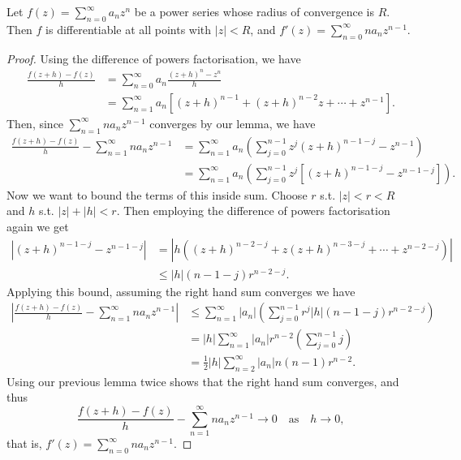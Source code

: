 \begin{theorem}
	Let $f(z) = \sum_{n = 0}^{\infty} a_n z^n$ be a power series whose radius of convergence is $R$. Then $f$ is differentiable at all points with $|z| < R$, and
	$
	f'(z) = \sum_{n = 0}^{\infty} n a_n z^{n - 1}.
	$
\end{theorem}
\begin{proof}
	Using the difference of powers factorisation, we have
	\begin{align*}
		\frac{f(z+h)-f(z)}{h}&=\sum_{n=0}^{\infty} a_{n} \frac{(z+h)^{n}-z^{n}}{h}\\&=\sum_{n=1}^{\infty} a_{n}\left[(z+h)^{n-1}+(z+h)^{n-2} z+\cdots+z^{n-1}\right].
	\end{align*}
	Then, since $\sum_{n = 1}^\infty n a_n z^{n - 1}$ converges by our lemma, we have
	\begin{align*}
		\frac{f(z+h)-f(z)}{h}-\sum_{n=1}^{\infty} n a_{n} z^{n-1} &= \sum_{n = 1}^{\infty} a_n \left(\sum_{j=0}^{n-1} z^{j}(z+h)^{n-1-j}-z^{n-1}\right) \\
		&= \sum_{n = 1}^{\infty} a_n \left(\sum_{j=0}^{n-1} z^{j}\left[(z+h)^{n-1-j}-z^{n-1 - j}\right]\right).
	\end{align*}
	Now we want to bound the terms of this inside sum. Choose $r$ s.t. $|z| < r < R$ and $h$ s.t. $|z| + |h| < r$. Then 
	employing the difference of powers factorisation again we get
	\begin{align*}
		|(z+h)^{n-1-j}-z^{n-1 - j}| &= |h((z + h)^{n - 2 - j} + z(z + h)^{n - 3 - j} + \cdots + z^{n - 2 - j})| \\
		&\leq |h|(n- 1 - j)r^{n - 2 - j}.
	\end{align*}
Applying this bound, assuming the right hand sum converges we have
\begin{align*}
	\left|\frac{f(z+h)-f(z)}{h}-\sum_{n=1}^{\infty} n a_{n} z^{n-1}\right| &\leq \sum_{n=1}^{\infty}\left|a_{n}\right|\left(\sum_{j=0}^{n-1} r^{j}|h|(n-1-j) r^{n-2-j}\right) \\
	&= |h| \sum_{n=1}^{\infty}\left|a_{n}\right| r^{n-2}\left(\sum_{j=0}^{n-1}j\right) \\
	&= \frac{1}{2}|h| \sum_{n=2}^{\infty}\left|a_{n}\right| n(n-1)r^{n-2}.
\end{align*}
Using our previous lemma twice shows that the right hand sum converges, and thus
$$
\frac{f(z+h)-f(z)}{h}-\sum_{n=1}^{\infty} n a_{n} z^{n-1} \rightarrow 0 \quad \text{as} \quad h \rightarrow 0,
$$
that is,
$
f'(z) = \sum_{n = 0}^{\infty} n a_n z^{n - 1}.
$
\end{proof}

